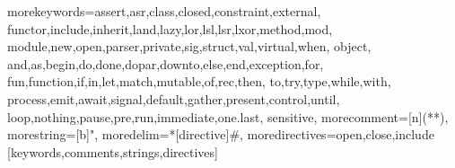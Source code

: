 
\usepackage{listings}
  {morekeywords={assert,asr,class,closed,constraint,external,%
      functor,include,inherit,land,lazy,lor,lsl,lsr,lxor,method,mod,%
      module,new,open,parser,private,sig,struct,val,virtual,when,%
      object,%
      and,as,begin,do,done,dopar,downto,else,end,exception,for,%
      fun,function,if,in,let,match,mutable,of,rec,then,%
      to,try,type,while,with,%
      process,emit,await,signal,default,gather,present,control,until,%
      loop,nothing,pause,pre,run,immediate,one.last},%
   sensitive,%
   morecomment=[n]{(*}{*)},%
   morestring=[b]",%
   moredelim=*[directive]\#,%
   moredirectives={open,close,include}%
  }[keywords,comments,strings,directives]%




